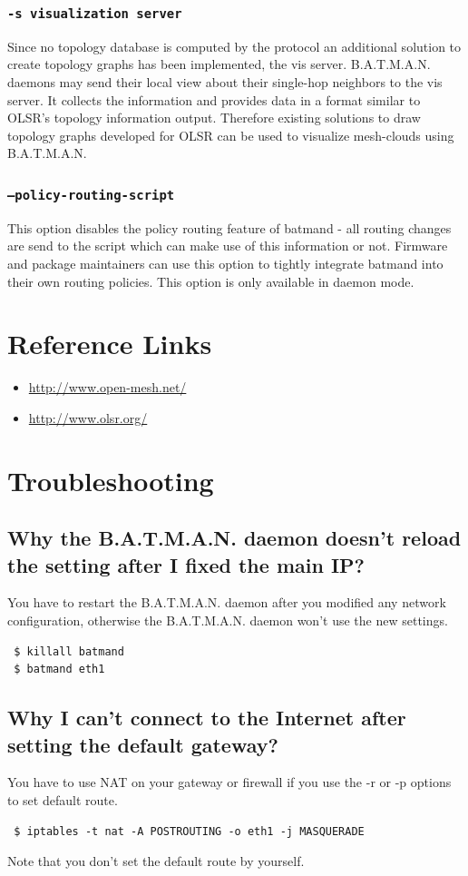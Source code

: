 \documentclass[
	12pt,
	a4paper,
	twoside,
	english,
	headsepline,
	footnosepline,
	automark,
	normalheadings,
	openany,
	cleardoubleplain,
	abstracton,
	idxtotoc,
	liststotoc,
	bibtotoc,
 	BCOR8mm,
]{scrartcl}
\newcommand{\subsubsectionttt}[1]{\subsubsection{\texttt{#1}}}
\begin{document}
\subsubsectionttt{-s visualization server}
Since no topology database is computed by the protocol an additional solution to
create topology graphs has been implemented, the vis server. B.A.T.M.A.N.
daemons may send their local view about their single-hop neighbors to the vis
server. It collects the information and provides data in a format similar to
OLSR's topology information output. Therefore existing solutions to draw
topology graphs developed for OLSR can be used to visualize mesh-clouds
using B.A.T.M.A.N.

\subsubsectionttt{--policy-routing-script}
This option disables the policy routing feature of batmand - all routing changes
are send to the script which can make use of this information or not. Firmware
and package maintainers can use this option to tightly integrate batmand into
their own routing policies. This option is only available in daemon mode.


\section{Reference Links}
\begin{itemize}
\item \url{http://www.open-mesh.net/}
\item \url{http://www.olsr.org/}
\end{itemize}

\section{Troubleshooting}
\subsection{Why the B.A.T.M.A.N. daemon doesn't reload the setting after I fixed the main IP?}
You have to restart the B.A.T.M.A.N. daemon after you modified any network
configuration, otherwise the B.A.T.M.A.N. daemon won't use the new settings.
\begin{verbatim}
 $ killall batmand
 $ batmand eth1
\end{verbatim}

\subsection{Why I can't connect to the Internet after setting the default gateway?}
You have to use NAT on your gateway or firewall if you use the -r or -p options
to set default route.
\begin{verbatim}
 $ iptables -t nat -A POSTROUTING -o eth1 -j MASQUERADE
\end{verbatim}
Note that you don't set the default route by yourself.
\end{document}
